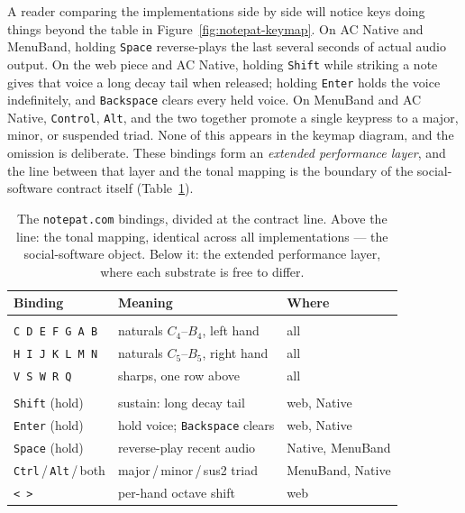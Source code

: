 \documentclass[10pt,letterpaper,twocolumn]{article}
\begin{document}
A reader comparing the implementations side by side will notice keys doing things beyond the table in Figure~\ref{fig:notepat-keymap}. On AC Native and MenuBand, holding \texttt{Space} reverse-plays the last several seconds of actual audio output. On the web piece and AC Native, holding \texttt{Shift} while striking a note gives that voice a long decay tail when released; holding \texttt{Enter} holds the voice indefinitely, and \texttt{Backspace} clears every held voice. On MenuBand and AC Native, \texttt{Control}, \texttt{Alt}, and the two together promote a single keypress to a major, minor, or suspended triad. None of this appears in the keymap diagram, and the omission is deliberate. These bindings form an \emph{extended performance layer}, and the line between that layer and the tonal mapping is the boundary of the social-software contract itself (Table~\ref{tab:contract-line}).

\begin{table}[t]
\footnotesize
\setlength{\tabcolsep}{3pt}
\renewcommand{\arraystretch}{1.05}
\centering
\caption{The \texttt{notepat.com} bindings, divided at the contract line. Above the line: the tonal mapping, identical across all implementations --- the social-software object. Below it: the extended performance layer, where each substrate is free to differ.}
\label{tab:contract-line}
\begin{tabularx}{\columnwidth}{@{}>{\RaggedRight}p{}>{\RaggedRight}X>{\RaggedRight\arraybackslash}p{}@{}}
\toprule
\textbf{Binding} & \textbf{Meaning} & \textbf{Where} \\
\midrule
\multicolumn{3}{@{}l}{\emph{Tonal contract}} \\[0.1em]
\texttt{C D E F G A B} & naturals $C_4$--$B_4$, left hand & all \\
\texttt{H I J K L M N} & naturals $C_5$--$B_5$, right hand & all \\
\texttt{V S W R Q} & sharps, one row above & all \\
\midrule
\multicolumn{3}{@{}l}{\emph{Extended performance layer}} \\[0.1em]
\texttt{Shift} (hold) & sustain: long decay tail & web, Native \\
\texttt{Enter} (hold) & hold voice; \texttt{Backspace} clears & web, Native \\
\texttt{Space} (hold) & reverse-play recent audio & Native, MenuBand \\
\texttt{Ctrl}\,/\,\texttt{Alt}\,/\,both & major\,/\,minor\,/\,sus2 triad & MenuBand, Native \\
\texttt{<}~\texttt{>} & per-hand octave shift & web \\
\bottomrule
\end{tabularx}
\end{table}
\end{document}
